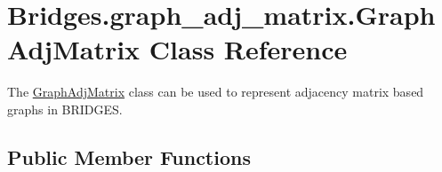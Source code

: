 \hypertarget{class_bridges_1_1graph__adj__matrix_1_1_graph_adj_matrix}{}\section{Bridges.\+graph\+\_\+adj\+\_\+matrix.\+Graph\+Adj\+Matrix Class Reference}
\label{class_bridges_1_1graph__adj__matrix_1_1_graph_adj_matrix}


The \hyperlink{class_bridges_1_1graph__adj__matrix_1_1_graph_adj_matrix}{Graph\+Adj\+Matrix} class can be used to represent adjacency matrix based graphs in B\+R\+I\+D\+G\+E\+S.  


\subsection*{Public Member Functions}
